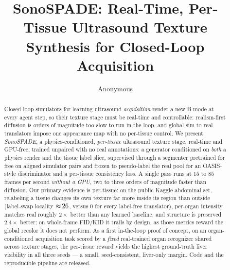 \documentclass[runningheads]{llncs}
\begin{document}
\title{SonoSPADE: Real-Time, Per-Tissue Ultrasound Texture\\Synthesis for Closed-Loop Acquisition}
\author{Anonymous}
\maketitle

\begin{abstract}
Closed-loop simulators for learning ultrasound \emph{acquisition} render a new B-mode at every agent
step, so their texture stage must be real-time and controllable: realism-first diffusion is orders of
magnitude too slow to run in the loop, and global sim-to-real translators impose one appearance map with
no per-tissue control. We present \emph{SonoSPADE}, a physics-conditioned, \emph{per-tissue} ultrasound
texture stage, real-time and GPU-free, trained unpaired with no real annotations: a generator
conditioned on \emph{both} a physics render and the tissue label slice, supervised through a segmenter
pretrained for free on aligned simulator pairs and frozen to pseudo-label the real pool for an
OASIS-style discriminator and a per-tissue consistency loss. A single pass runs at $15$ to $85$ frames
per second \emph{without a GPU}, two to three orders of magnitude faster than diffusion. Our primary
evidence is per-tissue: on the public Kaggle abdominal set, relabeling a tissue changes its own texture
far more inside its region than outside (label-swap locality ${\approx}\,26$, versus $0$ for
every label-free translator), per-organ intensity matches real roughly $2\times$ better than any learned
baseline, and structure is preserved $2.4\times$ better; on whole-frame FID/KID it trails by design, as
those metrics reward the global recolor it does not perform. As a first in-the-loop proof of concept, on
an organ-conditioned acquisition task scored by a \emph{fixed} real-trained organ recognizer shared
across texture stages, the per-tissue reward yields the highest ground-truth liver visibility in all
three seeds --- a small, seed-consistent, liver-only margin. Code and the reproducible pipeline are
released.
\end{abstract}
\end{document}
